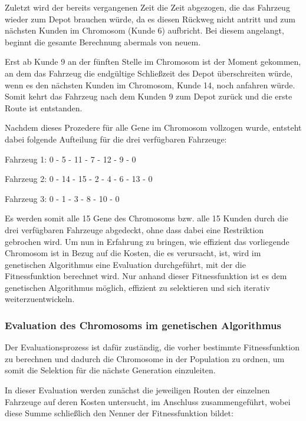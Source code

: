 \documentclass[a4paper,12pt,parskip,bibtotoc,liststotoc]{article}
\begin{document}
Zuletzt wird der bereits vergangenen Zeit die Zeit abgezogen, die das Fahrzeug wieder zum Depot brauchen würde, da es diesen Rückweg nicht antritt und zum nächsten Kunden im Chromosom (Kunde 6) aufbricht.
Bei diesem angelangt, beginnt die gesamte Berechnung abermals von neuem.

Erst ab Kunde 9 an der fünften Stelle im Chromosom ist der Moment gekommen, an dem das Fahrzeug die endgültige Schließzeit des Depot überschreiten würde, wenn es den nächsten Kunden im Chromosom, Kunde 14, noch anfahren würde.
Somit kehrt das Fahrzeug nach dem Kunden 9 zum Depot zurück und die erste Route ist entstanden. 

Nachdem dieses Prozedere für alle Gene im Chromosom vollzogen wurde, entsteht dabei folgende Aufteilung für die drei verfügbaren Fahrzeuge: 

\begin{center}

Fahrzeug 1: 0 - 5 - 11 - 7 - 12 - 9 - 0

Fahrzeug 2: 0 - 14 - 15 - 2 - 4 - 6 - 13 - 0

Fahrzeug 3: 0 - 1 - 3 - 8 - 10 - 0

\end{center}

Es werden somit alle 15 Gene des Chromosoms bzw. alle 15 Kunden durch die drei verfügbaren Fahrzeuge abgedeckt, ohne dass dabei eine Restriktion gebrochen wird.
Um nun in Erfahrung zu bringen, wie effizient das vorliegende Chromosom ist in Bezug auf die Kosten, die es verursacht, ist, wird im genetischen Algorithmus eine Evaluation durchgeführt, mit der die Fitnessfunktion berechnet wird. 
Nur anhand dieser Fitnessfunktion ist es dem genetischen Algorithmus möglich, effizient zu selektieren und sich iterativ weiterzuentwickeln.


\subsubsection{Evaluation des Chromosoms im genetischen Algorithmus}

Der Evaluationsprozess ist dafür zuständig, die vorher bestimmte Fitnessfunktion zu berechnen und dadurch die Chromosome in der Population zu ordnen, um somit die Selektion für die nächste Generation einzuleiten.

In dieser Evaluation werden zunächst die jeweiligen Routen der einzelnen Fahrzeuge auf deren Kosten untersucht, im Anschluss zusammengeführt, wobei diese Summe schließlich den Nenner der Fitnessfunktion bildet:
\end{document}
